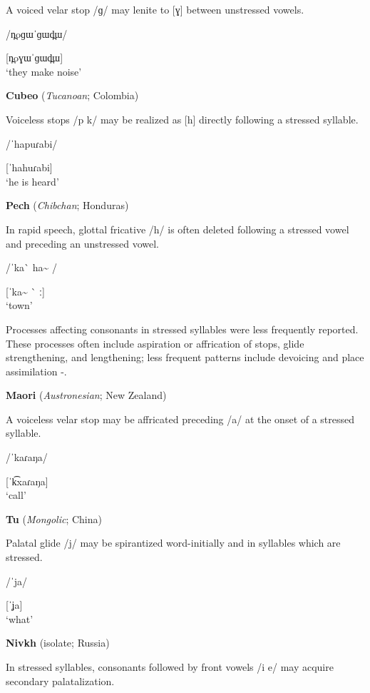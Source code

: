 A voiced velar stop /ɡ/ may lenite to [ɣ] between unstressed vowels.

/n̪oɡɯˈɡɯd̪ɯ/

[n̪oɣɯˈɡɯd̪ɯ]\\
\glt ‘they make noise’
\citep[27]{Donohue1999}
\z

\ea\label{ex:5.20}
  \textbf{Cubeo} (\textit{Tucanoan}; Colombia)

Voiceless stops /p k/ may be realized as [h] directly following a stressed syllable.

/ˈhapuɾabi/

[ˈhahuɾabi]\\
\glt ‘he is heard’
\citep[123]{Chacon2012}
\z

\ea\label{ex:5.21}
  \textbf{Pech} (\textit{Chibchan}; Honduras)

In rapid speech, glottal fricative /h/ is often deleted following a stressed vowel and preceding an unstressed vowel.

/ˈka\`{} ha\~{} /

[ˈka\~{} \`{} ː]\\
\glt ‘town’
\citep[24]{Holt1999}
\z

  Processes affecting consonants in stressed syllables were less frequently reported. These processes often include aspiration or affrication of stops, glide strengthening, and lengthening; less frequent patterns include devoicing and place assimilation -.

\ea\label{ex:5.22}
  \textbf{Maori} (\textit{Austronesian}; New Zealand)

A voiceless velar stop may be affricated preceding /a/ at the onset of a stressed syllable.

/ˈkaɾaŋa/

[ˈk͡xaɾaŋa]\\
\glt ‘call’
\citep[521-2]{Bauer1999}
\z

\ea\label{ex:5.23}
  \textbf{Tu} (\textit{Mongolic}; China)

Palatal glide /j/ may be spirantized word-initially and in syllables which are stressed.

/ˈja/

[ˈʝa]\\
\glt ‘what’
\citep[31-2]{Slater2003}
\z

\ea\label{ex:5.24}
  \textbf{Nivkh} (isolate; Russia)

In stressed syllables, consonants followed by front vowels /i e/ may acquire secondary palatalization.

